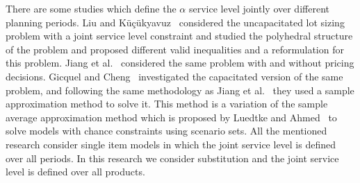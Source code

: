 \documentclass[10pt]{article}
\begin{document}
There are some studies which define the $\alpha$ service level jointly over different planning periods. Liu and K{\"u}{\c{c}}{\"u}kyavuz~\cite{liu2018polyhedral} considered the uncapacitated lot sizing problem with a joint service level constraint and studied the polyhedral structure of the problem and proposed different valid inequalities and a reformulation for this problem. Jiang et al.~\cite{jiang2017production} considered the same problem with and without pricing decisions. Gicquel and Cheng~\cite{gicquel2018joint} investigated the capacitated version of the same problem, and following the same methodology as Jiang et al.~\cite{jiang2017production} they used a sample approximation method to solve it. This method is a variation of the sample average approximation method which is proposed by Luedtke and Ahmed~\cite{luedtke2008sample} to solve models with chance constraints using scenario sets. All the mentioned research consider single item models in which the joint service level is defined over all periods. In this research we consider substitution and the joint service level is defined over all products.
\end{document}

